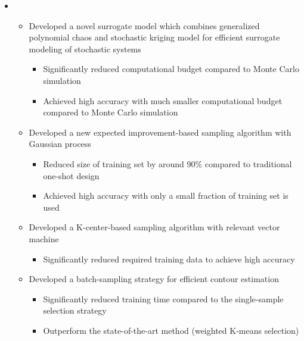 \documentclass[10pt]{article}
\begin{document}
\begin{itemize}
\begin{itemize}[label=$\bullet$]
	    \item {}
	    \begin{itemize}[label=$\bullet$]
	        \item Developed a novel surrogate model which combines generalized polynomial chaos and stochastic kriging model for efficient surrogate modeling of stochastic systems
	        \begin{itemize}[label=$-$]
	            \item Significantly reduced computational budget compared to Monte Carlo simulation
	            \item Achieved high accuracy with much smaller computational budget compared to Monte Carlo simulation
	        \end{itemize}
	        
	        \item Developed a new expected improvement-based sampling algorithm with Gaussian process
	        \begin{itemize}[label=$-$]
	            \item Reduced size of training set by around 90\% compared to traditional one-shot design
	            \item Achieved high accuracy with only a small fraction of training set is used 
	        \end{itemize}
	        
	        \item Developed a K-center-based sampling algorithm with relevant vector machine
	        \begin{itemize}[label=$-$]
	            \item Significantly reduced required training data to achieve high accuracy
	        \end{itemize}
	        
	        \item Developed a batch-sampling strategy for efficient contour estimation
	        \begin{itemize}[label=$-$]
	            \item Significantly reduced training time compared to the single-sample selection strategy
	            \item Outperform the state-of-the-art method (weighted K-means selection)
	        \end{itemize}
	    \end{itemize}
	    

\end{itemize}
\end{itemize}
\end{document}
